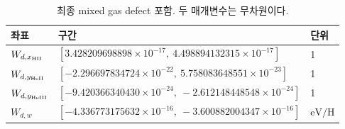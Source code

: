\begin{table}[H]
\centering\small
\caption{최종 mixed gas defect 포함. 두 매개변수는 무차원이다.}
\label{tab:mixed-gas}
\begin{tabular}{lll}\toprule
좌표 & 구간 & 단위 \\\midrule
$W_{d,x_{\rm HII}}$ & $[3.428209698898\times10^{-17},\ 4.498894132315\times10^{-17}]$ & 1 \\
$W_{d,y_{\rm HeII}}$ & $[-2.296697834724\times10^{-22},\ 5.758083648551\times10^{-23}]$ & 1 \\
$W_{d,y_{\rm HeIII}}$ & $[-9.420366340430\times10^{-24},\ -2.612148448548\times10^{-24}]$ & 1 \\
$W_{d,w}$ & $[-4.336773175632\times10^{-16},\ -3.600882004347\times10^{-16}]$ & $\mathrm{eV/H}$ \\
\bottomrule\end{tabular}
\end{table}
